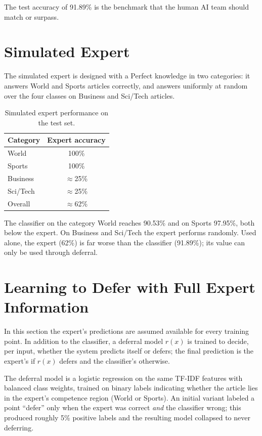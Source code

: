 \documentclass[11pt]{article}
\begin{document}
The test accuracy of 91.89\% is the benchmark that the human AI team should match or surpass.

\section{Simulated Expert}
\label{sec:expert}
The simulated expert is designed with a Perfect knowledge in two categories: it answers World and Sports articles correctly, and answers uniformly at random over the four classes on Business and Sci/Tech articles. 

\begin{table}[H]
\centering
\begin{tabular}{lc}
\toprule
Category & Expert accuracy \\
\midrule
World & 100\% \\
Sports & 100\% \\
Business & $\approx$25\% \\
Sci/Tech & $\approx$25\% \\
\midrule
Overall & $\approx$62\% \\
\bottomrule
\end{tabular}
\caption{Simulated expert performance on the test set.}
\end{table}

The classifier on the category World reaches 90.53\% and on Sports 97.95\%, both below the expert. On Business and Sci/Tech the expert performs randomly. Used alone, the expert (62\%) is far worse than the classifier (91.89\%); its value can only be used through deferral.

\section{Learning to Defer with Full Expert Information}
\label{sec:l2d}
In this section the expert's predictions are assumed available for every training point. In addition to the classifier, a deferral model $r(x)$ is trained to decide, per input, whether the system predicts itself or defers; the final prediction is the expert's if $r(x)$ defers and the classifier's otherwise.

The deferral model is a logistic regression on the same TF-IDF features with balanced class weights, trained on binary labels indicating whether the article lies in the expert's competence region (World or Sports). An initial variant labeled a point ``defer'' only when the expert was correct \emph{and} the classifier wrong; this produced roughly 5\% positive labels and the resulting model collapsed to never deferring.
\end{document}
